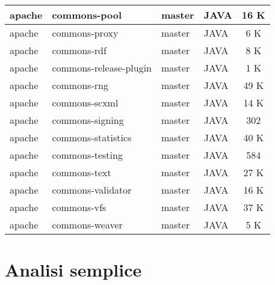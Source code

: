 \documentclass[a4paper,11pt,oneside, table]{article}
\begin{document}
\begin{table}
{\begin{tabular}{|l|l|l|l|c|}
      apache & commons-pool & master & JAVA & 16 K \\ \hline
      apache & commons-proxy & master & JAVA & 6 K \\ \hline
      apache & commons-rdf & master & JAVA & 8 K \\ \hline
      apache & commons-release-plugin & master & JAVA & 1 K \\ \hline
      apache & commons-rng & master & JAVA & 49 K \\ \hline
      apache & commons-scxml & master & JAVA & 14 K \\ \hline
      apache & commons-signing & master & JAVA & 302 \\ \hline
      apache & commons-statistics & master & JAVA & 40 K \\ \hline
      apache & commons-testing & master & JAVA & 584 \\ \hline
      apache & commons-text & master & JAVA & 27 K \\ \hline
      apache & commons-validator & master & JAVA & 16 K \\ \hline
      apache & commons-vfs & master & JAVA & 37 K \\ \hline
      apache & commons-weaver & master & JAVA & 5 K \\ \hline
    \end{tabular}
    }
  \end{table}

  \begin{table}
    \label{tbl:gruppo-analisi-sequenziale}
  \end{table}

  \section{Analisi semplice}
\end{document}

